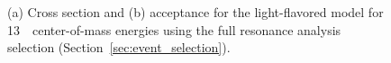 \begin{figure}[!htb]
  \centering
  \caption{(a) Cross section and (b) acceptance for the 
  light-flavored \qstar model for 13~\TeV~center-of-mass energies using the full resonance
  analysis selection (Section~\ref{sec:event_selection}).}
\end{figure}


\clearpage

